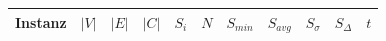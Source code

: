 \documentclass[paper=a4,fontsize=12pt]{scrartcl}
\begin{document}
\begin{table}
\centering
\begin{tabular}{c|rrr|r|c|rrr|r|r}
Instanz & $|V|$ & $|E|$ & $|C|$ & $S_i$ & $N$ & $S_{min}$ & $S_{avg}$ & $S_{\sigma}$ & $S_{\Delta}$ & $t$ \\
\hline\hline

\end{tabular}
\end{table}
\end{document}
